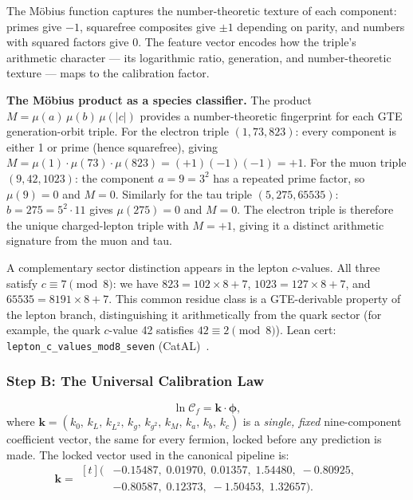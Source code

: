 \documentclass[11pt,a4paper]{article}
\newcommand{\lean}[1]{\texttt{#1}}
\newcommand{\CatAL}{\textsf{CatAL}}
\begin{document}
The M\"{o}bius function captures the number-theoretic texture of each component:
primes give $-1$, squarefree composites give $\pm 1$ depending on parity, and
numbers with squared factors give $0$.  The feature vector encodes how the
triple's arithmetic character --- its logarithmic ratio, generation, and
number-theoretic texture --- maps to the calibration factor.

\medskip
\noindent\textbf{The M\"{o}bius product as a species classifier.}\enspace
The product $M = \mu(a)\,\mu(b)\,\mu(|c|)$ provides a number-theoretic fingerprint for
each GTE generation-orbit triple.
For the electron triple $(1, 73, 823)$: every component is either 1 or prime (hence
squarefree), giving $M = \mu(1)\cdot\mu(73)\cdot\mu(823) = (+1)(-1)(-1) = +1$.
For the muon triple $(9, 42, 1023)$: the component $a = 9 = 3^2$ has a repeated prime
factor, so $\mu(9) = 0$ and $M = 0$.
Similarly for the tau triple $(5, 275, 65535)$: $b = 275 = 5^2 \cdot 11$ gives $\mu(275) = 0$
and $M = 0$.
The electron triple is therefore the unique charged-lepton triple with $M = +1$, giving it a
distinct arithmetic signature from the muon and tau.

A complementary sector distinction appears in the lepton $c$-values.  All three satisfy
$c \equiv 7 \pmod{8}$: we have $823 = 102 \times 8 + 7$, $1023 = 127 \times 8 + 7$,
and $65535 = 8191 \times 8 + 7$.  This common residue class is a GTE-derivable property
of the lepton branch, distinguishing it arithmetically from the quark sector
(for example, the quark $c$-value 42 satisfies $42 \equiv 2 \pmod{8}$).
Lean cert: \lean{lepton\_c\_values\_mod8\_seven} (\CatAL)~\cite{SpivackGTECompleteFramework}.

\subsubsection*{Step B: The Universal Calibration Law}

\begin{tcolorbox}[colback=boxyellow,colframe=yellow!75!black,
  title={Universal Calibration Law (UCL)}, breakable]
\[
  \ln \mathcal{C}_f = \mathbf{k} \cdot \boldsymbol{\phi},
\]
where $\mathbf{k} = (k_0,\, k_L,\, k_{L^2},\, k_g,\, k_{g^2},\, k_M,\, k_a,\, k_b,\, k_c)$
is a \emph{single, fixed} nine-component coefficient vector, the same for every
fermion, locked before any prediction is made.  The locked vector used in
the canonical pipeline is:
\[
  \mathbf{k} = \begin{aligned}[t]
    (&-0.15487,\; 0.01970,\; 0.01357,\; 1.54480,\; -0.80925,\\
     &-0.80587,\; 0.12373,\; -1.50453,\; 1.32657).
  \end{aligned}
\]
\end{tcolorbox}
\end{document}
